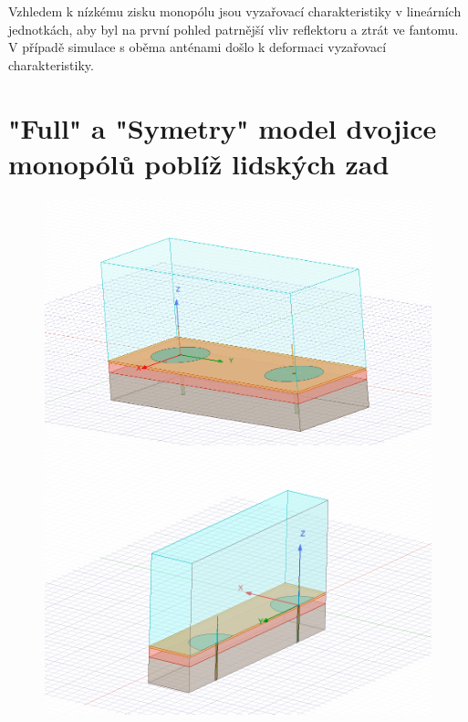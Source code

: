 \documentclass[10pt, a4paper]{article}%
\begin{document}
Vzhledem k nízkému zisku monopólu jsou vyzařovací charakteristiky v lineárních jednotkách, aby byl
na první pohled patrnější vliv reflektoru a ztrát ve fantomu. V případě simulace s oběma anténami došlo k deformaci
vyzařovací charakteristiky. 


\clearpage

\section{\Large "Full"  a "Symetry" model dvojice monopólů poblíž lidských zad}
\begin{figure}[ht!]
	\centering
	\begin{minipage}{0.45\textwidth}
		\centering
		\includegraphics[width= 1\textwidth, height = 0.25\textheight]{dual_model.png}
	\end{minipage}%
	\hfill
	\begin{minipage}{0.45\textwidth}
		\centering
		\includegraphics[width= 1\textwidth,height = 0.25\textheight]{symetry_model.png}
	\end{minipage}
	\end{figure}
\end{document}
